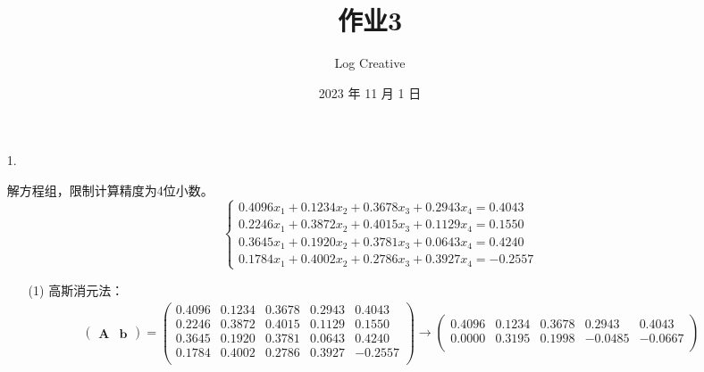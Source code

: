 \documentclass{sjtuarticle}
\title{作业3}
\author{Log Creative}
\date{2023 年 11 月 1 日}
\begin{document}
\maketitle

\begin{itemize}
    \item[1.] 
    \begin{solution}
        解方程组，限制计算精度为4位小数。
        \begin{equation*}
            \begin{cases}
                0.4096x_1+0.1234x_2+0.3678x_3+0.2943x_4=0.4043 \\
                0.2246x_1+0.3872x_2+0.4015x_3+0.1129x_4=0.1550 \\
                0.3645x_1+0.1920x_2+0.3781x_3+0.0643x_4=0.4240 \\
                0.1784x_1+0.4002x_2+0.2786x_3+0.3927x_4=-0.2557
            \end{cases}
        \end{equation*}
        \begin{itemize}
            \item[(1)] 高斯消元法：
        \begin{align*}
            \begin{pmatrix}
                \bm{A} & \bm{b}
            \end{pmatrix}=\begin{pmatrix}
                0.4096 &       0.1234 &       0.3678 &       0.2943 &        0.4043\\
                0.2246 &       0.3872 &       0.4015 &       0.1129 &        0.1550\\
                0.3645 &       0.1920 &       0.3781 &       0.0643 &        0.4240\\
                0.1784 &       0.4002 &       0.2786 &       0.3927 &       -0.2557\\
            \end{pmatrix}\rightarrow
            \begin{pmatrix}
                0.4096 &       0.1234 &       0.3678 &       0.2943 &        0.4043\\
                0.0000 &       0.3195 &       0.1998 &      -0.0485 &       -0.0667\\

\end{pmatrix}
\end{align*}
\end{itemize}
\end{solution}
\end{itemize}
\end{document}
